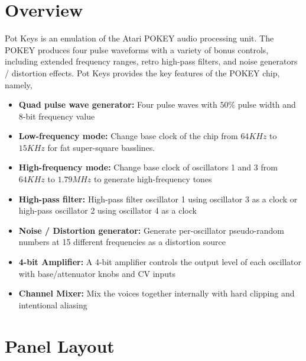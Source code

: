 \documentclass[12pt,letter]{article}
\begin{document}


\section*{Overview}

Pot Keys is an emulation of the Atari POKEY audio processing unit. The POKEY produces four pulse waveforms with a variety of bonus controls, including extended frequency ranges, retro high-pass filters, and noise generators / distortion effects. Pot Keys provides the key features of the POKEY chip, namely,
\begin{itemize}
  \item \textbf{Quad pulse wave generator:} Four pulse waves with $50\%$ pulse width and 8-bit frequency value
  \item \textbf{Low-frequency mode:} Change base clock of the chip from $64 KHz$ to $15 KHz$ for fat super-square basslines.
  \item \textbf{High-frequency mode:} Change base clock of oscillators 1 and 3 from $64 KHz$ to $1.79 MHz$ to generate high-frequency tones
  \item \textbf{High-pass filter:} High-pass filter oscillator 1 using oscillator 3 as a clock or high-pass oscillator 2 using oscillator 4 as a clock
  \item \textbf{Noise / Distortion generator:} Generate per-oscillator pseudo-random numbers at 15 different frequencies as a distortion source
  \item \textbf{4-bit Amplifier:} A 4-bit amplifier controls the output level of each oscillator with base/attenuator knobs and CV inputs
  \item \textbf{Channel Mixer:} Mix the voices together internally with hard clipping and intentional aliasing
\end{itemize}


\clearpage
\section*{Panel Layout}
\end{document}
